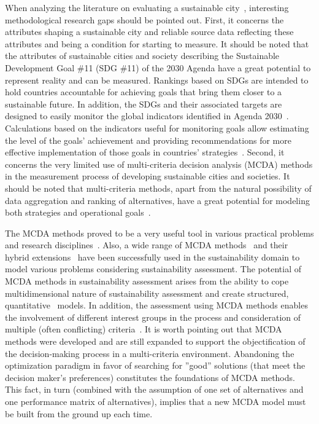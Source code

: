 \documentclass[5p,times]{elsarticle}
\begin{document}
When analyzing the literature on evaluating a sustainable city~\cite{reis2019evaluation, yi2019evaluation}, interesting methodological research gaps should be pointed out. First, it concerns the attributes shaping a sustainable city and reliable source data reflecting these attributes and being a condition for starting to measure. It should be noted that the attributes of sustainable cities and society describing the Sustainable Development Goal \#11 (SDG \#11) of the 2030 Agenda have a great potential to represent reality and can be measured. Rankings based on SDGs are intended to hold countries accountable for achieving goals that bring them closer to a sustainable future. In addition, the SDGs and their associated targets are designed to easily monitor the global indicators identified in Agenda 2030~\cite{miola2019measuring, koch2018contextualize}. Calculations based on the indicators useful for monitoring goals allow estimating the level of the goals' achievement and providing recommendations for more effective implementation of those goals in countries' strategies~\cite{boto2020implementation}. Second, it concerns the very limited use of multi-criteria decision analysis (MCDA) methods in the measurement process of developing sustainable cities and societies. It should be noted that multi-criteria methods, apart from the natural possibility of data aggregation and ranking of alternatives, have a great potential for modeling both strategies and operational goals~\cite{modibbo2021multi}.

The MCDA methods proved to be a very useful tool in various practical problems and research disciplines~\cite{cegan2017trends, marttunen2017structuring}. Also, a wide range of MCDA methods~\cite{figueira2005multiple} and their hybrid extensions~\cite{cinelli2014analysis} have been successfully used in the sustainability domain to model various problems considering sustainability assessment. The potential of MCDA methods in sustainability assessment arises from the ability to cope multidimensional nature of sustainability assessment and create structured, quantitative~\cite{oppio2018assessing} models. In addition, the assessment using MCDA methods enables the involvement of different interest groups in the process and consideration of multiple (often conflicting) criteria~\cite{fernandes2018assessing, bhardwaj2019more}. It is worth pointing out that MCDA methods were developed and are still expanded to support the objectification of the decision-making process in a multi-criteria environment. Abandoning the optimization paradigm in favor of searching for ''good'' solutions (that meet the decision maker's preferences) constitutes the foundations of MCDA methods. This fact, in turn (combined with the assumption of one set of alternatives and one performance matrix of alternatives), implies that a new MCDA model must be built from the ground up each time.
\end{document}
